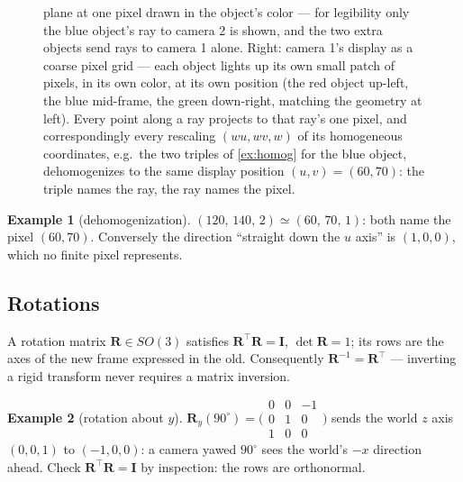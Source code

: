 \documentclass[11pt]{article}
\theoremstyle{definition}
\newtheorem{example}{Example}
\newcommand{\mat}[1]{\mathbf{#1}}
\newcommand{\R}{\mat{R}}
\begin{document}
\begin{figure}[t]
{plane at one pixel drawn in the object's color --- for legibility only
the blue object's ray to camera 2 is shown, and the two extra objects
send rays to camera 1 alone. Right: camera 1's display as a coarse
pixel grid --- each object lights up its own small patch of pixels, in
its own color, at its own position (the red object up-left, the blue
mid-frame, the green down-right, matching the geometry at left).
Every point along a ray projects to that ray's one pixel, and
correspondingly every rescaling $(wu,wv,w)$ of its homogeneous
coordinates, e.g.\ the two triples of \autoref{ex:homog} for the blue
object, dehomogenizes to the same display position $(u,v)=(60,70)$:
the triple names the ray, the ray names the pixel.}
\label{fig:homogpixels}
\end{figure}

\begin{example}[dehomogenization]
\label{ex:homog}
$(120,\,140,\,2) \simeq (60,\,70,\,1)$: both name the pixel $(60,70)$.
Conversely the direction ``straight down the $u$ axis'' is $(1,0,0)$, which
no finite pixel represents.
\end{example}

\subsection{Rotations}
A rotation matrix $\R\in SO(3)$ satisfies $\R^{\!\top}\R=\mat{I}$,
$\det\R=1$; its rows are the axes of the new frame expressed in the old.
Consequently $\R^{-1}=\R^{\!\top}$ --- inverting a rigid transform never
requires a matrix inversion.

\begin{example}[rotation about $y$]
\label{ex:rot}
$\R_y(90^\circ)=\bigl(\begin{smallmatrix}0&0&-1\\0&1&0\\1&0&0\end{smallmatrix}\bigr)$
sends the world $z$ axis $(0,0,1)$ to $(-1,0,0)$: a camera yawed $90^\circ$
sees the world's $-x$ direction ahead. Check $\R^{\!\top}\R=\mat I$ by
inspection: the rows are orthonormal.
\end{example}
\end{document}
